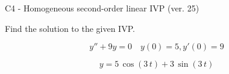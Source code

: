 \begin{exercise}
  \begin{exerciseTitle}C4 - Homogeneous second-order linear IVP (ver. 25)\end{exerciseTitle}
  \begin{exerciseStatement}
    
Find the solution to the given IVP.

    
\[y''+9y = 0 \hspace{1em} y(0) = 5 , y'(0) = 9\]

  \end{exerciseStatement}
  \begin{exerciseAnswer}
    
\[y= 5 \, \cos\left(3 \, t\right) + 3 \, \sin\left(3 \, t\right)\]

  \end{exerciseAnswer}
\end{exercise}